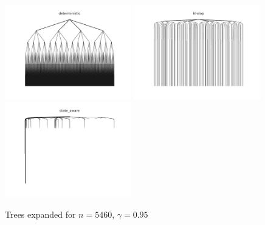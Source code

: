 \documentclass{article}
\begin{document}
\begin{figure}[H]
    \centering
    \includegraphics[width=0.49\textwidth]{img/4_deterministic.pdf}
    \includegraphics[width=0.49\textwidth]{img/4_kl-olop.pdf}
    \includegraphics[width=0.49\textwidth]{img/4_state_aware.pdf}
    \caption{Trees expanded for $n = 5460$, $\gamma=0.95$}
    \label{fig:gw4_trees}
\end{figure}
\end{document}
